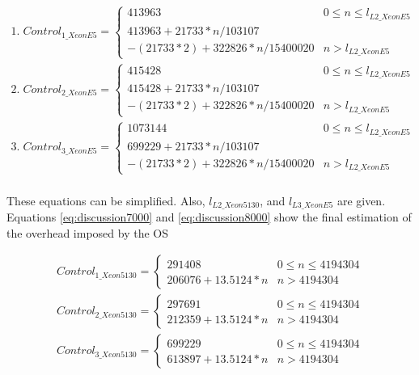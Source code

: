 \begin{equation}\label{eq:discussion800}
\begin{split}
1.\; Control_{1\_XeonE5} = \begin{cases}413963 & 0 \leq n \leq l_{L2\_XeonE5} \\ 413963 + 21733 * n / 103107 \\ - (21733 * 2) + 322826 * n / 15400020 & n > l_{L2\_XeonE5}\end{cases} \\
2.\; Control_{2\_XeonE5} = \begin{cases}415428 & 0 \leq n \leq l_{L2\_XeonE5} \\ 415428 + 21733 * n / 103107 \\ - (21733 * 2) + 322826 * n / 15400020 & n > l_{L2\_XeonE5}\end{cases} \\
3.\; Control_{3\_XeonE5} = \begin{cases}1073144 & 0 \leq n \leq l_{L2\_XeonE5} \\ 699229 + 21733 * n / 103107 \\ - (21733 * 2) + 322826 * n / 15400020 & n > l_{L2\_XeonE5}\end{cases} \\
\end{split}
\end{equation}

These equations can be simplified. Also, $l_{L2\_Xeon5130}$, and $l_{L3\_XeonE5}$ are given. Equations \ref{eq:discussion7000} and \ref{eq:discussion8000} show the final estimation of the overhead imposed by the OS

\begin{equation}\label{eq:discussion7000}
\begin{split}
Control_{1\_Xeon5130} = \begin{cases}291408 & 0 \leq n \leq 4194304 \\ 206076 + 13.5124 * n & n > 4194304\end{cases} \\
Control_{2\_Xeon5130} = \begin{cases}297691 & 0 \leq n \leq 4194304 \\ 212359 + 13.5124 * n & n > 4194304\end{cases} \\
Control_{3\_Xeon5130} = \begin{cases}699229 & 0 \leq n \leq 4194304 \\ 613897 + 13.5124 * n & n > 4194304\end{cases} \\
\end{split}
\end{equation}

